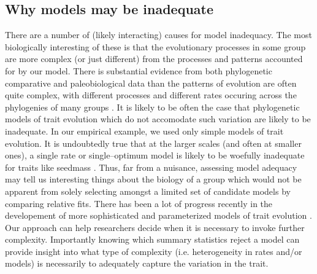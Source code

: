 \documentclass[a4paper,12pt]{article}
\begin{document}
\subsection*{Why models may be inadequate}
There are a number of (likely interacting) causes for model inadequacy. The most biologically interesting of these is that the evolutionary processes in some group are more complex (or just different) from the processes and patterns accounted for by our model.  There is substantial evidence from both phylogenetic comparative and paleobiological data than the patterns of evolution are often quite complex, with different processes and different rates occuring across the phylogenies of many groups \citep{Foote1997, Grey2008, Hunt2012, Hopkins2012, PennellPE}. It is likely to be often the case that phylogenetic models of trait evolution which do not accomodate  such variation are likely to be inadequate. In our empirical example, we used only simple models of trait evolution. It is undoubtedly true that at the larger scales (and often at smaller ones), a single rate or single--optimum model is likely to be woefully inadequate for traits like seedmass \citep{Moles2005}. Thus, far from a nuisance, assessing model adequacy may tell us interesting things about the biology of a group which would not be apparent from solely selecting amongst a limited set of candidate models by comparing relative fits. There has been a lot of progress recently in the developement of more sophisticated and parameterized models of trait evolution \citep{ButlerKing2004, Omeara2006, FitzJohn2010, Eastman2011, Venditti2011, Revell2012, Beaulieu2012}. Our approach can help researchers decide when it is necessary to invoke further complexity. Importantly knowing which summary statistics reject a model can provide insight into what type of complexity (i.e. heterogeneity in rates and/or models) is necessarily to adequately capture the variation in the trait.
\end{document}
